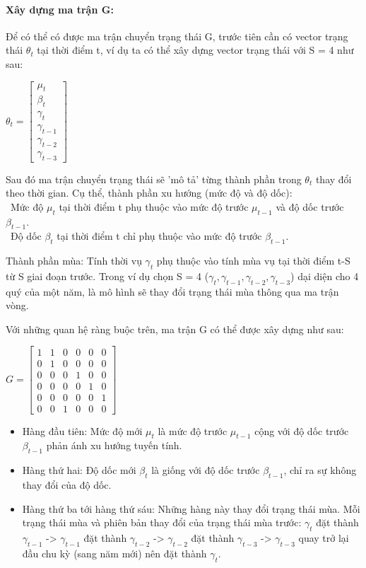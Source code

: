 \documentclass[conference]{IEEEtran}
\begin{document}
\paragraph{Xây dựng ma trận G:}
Để có thể có được ma trận chuyển trạng thái G, trước tiên cần có vector trạng thái \(\theta_{t}\) tại thời điểm t, ví dụ ta có thể xây dựng vector trạng thái với S = 4 như sau:
\begin{center}
    \(\theta_{t} = \begin{bmatrix}
        \mu_{t} \\ \beta_{t}
        \\ \gamma_{t}
        \\ \gamma_{t-1}
        \\ \gamma_{t-2}
        \\ \gamma_{t-3}
    \end{bmatrix}\)
\end{center}
Sau đó ma trận chuyển trạng thái sẽ 'mô tả' từng thành phần trong \(\theta_{t}\) thay đổi theo thời gian. Cụ thể, thành phần xu hướng (mức độ và độ dốc):\\
\indent\textbullet\ Mức độ \(\mu_{t}\) tại thời điểm t phụ thuộc vào mức độ trước \(\mu_{t-1}\) và độ dốc trước \(\beta_{t-1}\).\\
\indent\textbullet\ Độ dốc \(\beta_{t}\) tại thời điểm t chỉ phụ thuộc vào mức độ trước \(\beta_{t-1}\).

Thành phần mùa: Tính thời vụ \(\gamma_{t}\) phụ thuộc vào tính mùa vụ tại thời điểm t-S từ S giai đoạn trước. Trong ví dụ chọn S = 4 (\(\gamma_{t}, \gamma_{t-1}, \gamma_{t-2}, \gamma_{t-3}\)) dại diện cho 4 quý của một năm, là mô hình sẽ thay đổi trạng thái mùa thông qua ma trận vòng.

Với những quan hệ ràng buộc trên, ma trận G có thể được xây dựng như sau:\\
\begin{center}
    \(G=\begin{bmatrix}
        1 & 1 & 0 & 0 & 0 & 0 \\
        0 & 1 & 0 & 0 & 0 & 0 \\
        0 & 0 & 0 & 1 & 0 & 0 \\
        0 & 0 & 0 & 0 & 1 & 0 \\
        0 & 0 & 0 & 0 & 0 & 1 \\
        0 & 0 & 1 & 0 & 0 & 0
    \end{bmatrix}\)
\end{center}
\begin{itemize}
    \item Hàng đầu tiên: Mức độ mới \(\mu_{t}\) là mức độ trước \(\mu_{t-1}\) cộng với độ dốc trước \(\beta_{t-1}\) phản ánh xu hướng tuyến tính.
    \item Hàng thứ hai: Độ dốc mới \(\beta_{t}\) là giống với độ dốc trước \(\beta_{t-1}\), chỉ ra sự không thay đổi của độ dốc.
    \item Hàng thứ ba tới hàng thứ sáu: Những hàng này thay đổi trạng thái mùa. Mỗi trạng thái mùa và phiên bản thay đổi của trạng thái mùa trước: \(\gamma_{t}\) đặt thành \(\gamma_{t-1}\) -> \(\gamma_{t-1}\) đặt thành \(\gamma_{t-2}\) -> \(\gamma_{t-2}\) đặt thành \(\gamma_{t-3}\) -> \(\gamma_{t-3}\) quay trở lại đầu chu kỳ (sang năm mới) nên đặt thành \(\gamma_{t}\).
\end{itemize}
\end{document}

